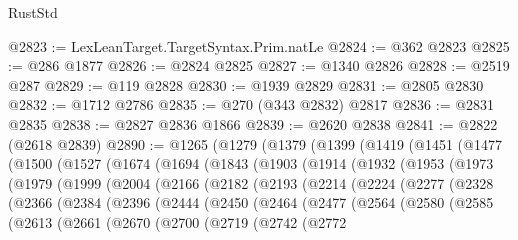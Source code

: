 \begin{lexlean}{RustStd}
\begin{coremodule}
@2823 := LexLeanTarget.TargetSyntax.Prim.natLe
@2824 := @362 @2823
@2825 := @286 @1877
@2826 := @2824 @2825
@2827 := @1340 @2826
@2828 := @2519 @287
@2829 := @119 @2828
@2830 := @1939 @2829
@2831 := @2805 @2830
@2832 := @1712 @2786
@2835 := @270 (@343 @2832) @2817
@2836 := @2831 @2835
@2838 := @2827 @2836 @1866
@2839 := @2620 @2838
@2841 := @2822 (@2618 @2839)
@2890 := @1265
    (@1279
      (@1379
        (@1399
          (@1419
            (@1451
              (@1477
                (@1500
                  (@1527
                    (@1674
                      (@1694
                        (@1843
                          (@1903
                            (@1914
                              (@1932
                                (@1953
                                  (@1973
                                    (@1979
                                      (@1999
                                        (@2004
                                          (@2166
                                            (@2182
                                              (@2193
                                                (@2214
                                                  (@2224
                                                    (@2277
                                                      (@2328
                                                        (@2366
                                                          (@2384
                                                            (@2396
                                                              (@2444
                                                                (@2450
                                                                  (@2464
                                                                    (@2477
                                                                      (@2564
                                                                        (@2580
                                                                          (@2585
                                                                            (@2613
                                                                              (@2661
                                                                                (@2670
                                                                                  (@2700
                                                                                    (@2719
                                                                                      (@2742
                                                                                        (@2772

\end{coremodule}
\end{lexlean}
